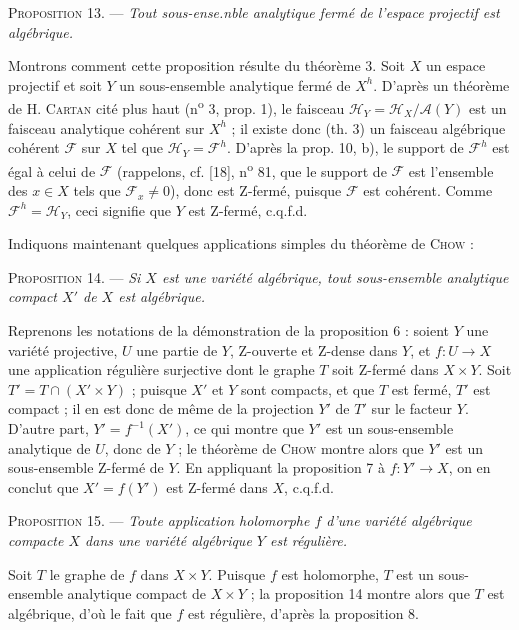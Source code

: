 \textsc{Proposition} 13. --- \textit{Tout sous-ense.nble analytique fermé de l'espace projectif est algébrique.}

Montrons comment cette proposition résulte du théorème 3. Soit $X$ un espace projectif et soit $Y$ un sous-ensemble analytique fermé de $X^h$. D'après un théorème de H. \textsc{Cartan} cité plus haut (n\textsuperscript{o} 3, prop. 1), le faisceau $\mathcal{H}_Y = \mathcal{H}_X/\mathcal{A}(Y)$ est un faisceau analytique cohérent sur $X^h$ ; il existe donc (th. 3) un faisceau algébrique cohérent $\mathcal{F}$ sur $X$ tel que $\mathcal{H}_Y = \mathcal{F}^h$. D'après la prop. 10, b), le support de $\mathcal{F}^h$ est égal à celui de $\mathcal{F}$ (rappelons, cf. [18], n\textsuperscript{o} 81, que le support de $\mathcal{F}$ est l'ensemble des $x \in X$ tels que $\mathcal{F}_x \neq 0$), donc est Z-fermé, puisque $\mathcal{F}$ est cohérent. Comme $\mathcal{F}^h = \mathcal{H}_Y$, ceci signifie que $Y$ est Z-fermé, c.q.f.d.

Indiquons maintenant quelques applications simples du théorème de \textsc{Chow} :

\textsc{Proposition} 14. --- \textit{Si $X$ est une variété algébrique, tout sous-ensemble analytique compact $X'$ de $X$ est algébrique.}

Reprenons les notations de la démonstration de la proposition 6 : soient $Y$ une variété projective, $U$ une partie de $Y$, Z-ouverte et Z-dense dans $Y$, et $f : U \to X$ une application régulière surjective dont le graphe $T$ soit Z-fermé dans $X \times Y$. Soit $T' = T \cap (X' \times Y)$ ; puisque $X'$ et $Y$ sont compacts, et que $T$ est fermé, $T'$ est compact ; il en est donc de même de la projection $Y'$ de $T'$ sur le facteur $Y$. D'autre part, $Y' = f^{-1}(X')$, ce qui montre que $Y'$ est un sous-ensemble analytique de $U$, donc de $Y$ ; le théorème de \textsc{Chow} montre alors que $Y'$ est un sous-ensemble Z-fermé de $Y$. En appliquant la proposition 7 à $f : Y' \to X$, on en conclut que $X' = f(Y')$ est Z-fermé dans $X$, c.q.f.d.

\textsc{Proposition} 15. --- \textit{Toute application holomorphe $f$ d'une variété algébrique compacte $X$ dans une variété algébrique $Y$ est régulière.}



Soit $T$ le graphe de $f$ dans $X \times Y$. Puisque $f$ est holomorphe, $T$ est un sous-ensemble analytique compact de $X \times Y$ ; la proposition 14 montre alors que $T$ est algébrique, d'où le fait que $f$ est régulière, d'après la proposition 8.

